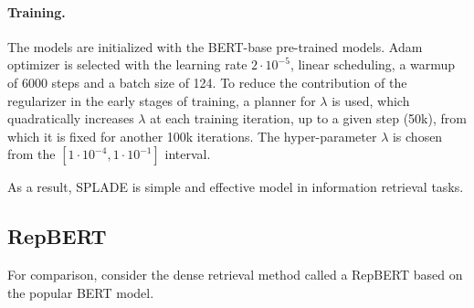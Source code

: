 \documentclass[
    twocolumn,
]{ceurart}
\begin{document}
    \paragraph{Training.}
    The models are initialized with the BERT-base pre-trained models.
    Adam optimizer is selected with the learning rate $2 \cdot 10^{-5}$, linear scheduling,
    a warmup of 6000 steps and a batch size of 124.
    To reduce the contribution of the regularizer in the early stages of training, a planner for
    $\lambda$ is used, which quadratically increases $\lambda$ at each training iteration, up to a
    given step (50k), from which it is fixed for another 100k iterations.
    The hyper-parameter $\lambda$ is chosen from the $[1 \cdot 10^{-4}, 1 \cdot 10^{-1}]$ interval.

    As a result, SPLADE is simple and effective model in information retrieval tasks.

    \subsection{RepBERT}

    For comparison, consider the dense retrieval method called a RepBERT based
    on the popular BERT model.
\end{document}
